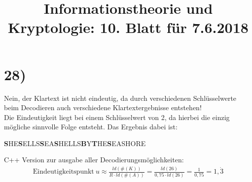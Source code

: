 %



  \title{Informationstheorie und Kryptologie: 10. Blatt für 7.6.2018}
  \maketitle

  \section*{28)}

    Nein, der Klartext ist nicht eindeutig, da durch verschiedenen Schlüsselwerte beim Decodieren auch verschiedene Klartextergebnisse entstehen!\\
    \newline
    Die Eindeutigkeit liegt bei einem Schlüsselwert von 2, da hierbei die einzig mögliche sinnvolle Folge entsteht. Das Ergebnis dabei ist:
    \begin{center}
    	\textbf{S}HE\textbf{S}ELLS\textbf{S}EA\textbf{S}HELLS\textbf{B}Y\textbf{T}HE\textbf{S}EASHORE
    \end{center}
    C++ Version zur ausgabe aller Decodierungsmöglichkeiten:\\
    

  \begin{align*}
    \text{Eindeutigkeitspunkt}\ u \approx \frac{ld(\#(K))}{R \cdot ld(\#(A))} = \frac{ld(26)}{0,75 \cdot ld(26)} = \frac{1}{0,75} = 1,\dot{3}
  \end{align*}

